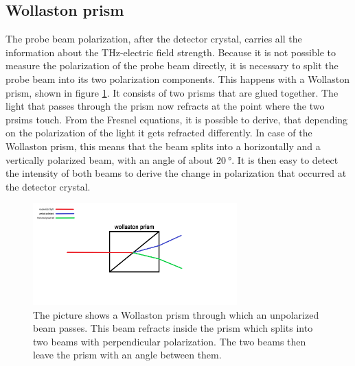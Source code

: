 \subsection{Wollaston prism}
\label{sec:wollaston}
The probe beam polarization, after the detector crystal, carries all the information about the $\si{\tera\hertz}$-electric field strength.
Because it is not possible to measure the polarization of the probe beam directly, it is necessary to split the probe beam into its two polarization components.
This happens with a Wollaston prism, shown in figure \ref{fig:wollaston}.
It consists of two prisms that are glued together.
The light that passes through the prism now refracts at the point where the two prsims touch.
From the Fresnel equations, it is possible to derive, that depending on the polarization of the light it gets refracted differently.
In case of the Wollaston prism, this means that the beam splits into a horizontally and a vertically polarized beam, with an angle of about $\SI{20}{\degree}$.
It is then easy to detect the intensity of both beams to derive the change in polarization that occurred at the detector crystal. 
\begin{figure}
    \centering
    \includegraphics[width=0.7\textwidth]{refferenced_pic/wollaston.png}
    \caption{The picture shows a Wollaston prism through which an unpolarized beam passes.
    This beam refracts inside the prism which splits into two beams with perpendicular polarization.
    The two beams then leave the prism with an angle between them.}
    \label{fig:wollaston}
\end{figure}
